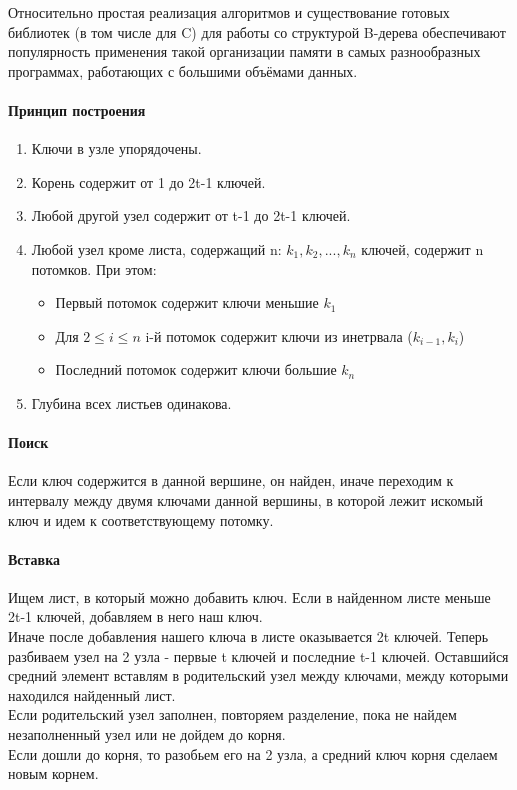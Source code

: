 \documentclass[a4paper,10pt]{article}
\begin{document}
Относительно простая реализация алгоритмов и существование готовых библиотек (в том числе для C) для работы со структурой B-дерева обеспечивают популярность применения такой организации памяти в самых разнообразных программах, работающих с большими объёмами данных.\\
\paragraph{Принцип построения}
\begin{enumerate}
	\item Ключи в узле упорядочены.
	\item Корень содержит от 1 до 2t-1 ключей.
	\item Любой другой узел содержит от t-1 до 2t-1 ключей.
	\item Любой узел кроме листа, содержащий n: $k_1, k_2, ..., k_n$ ключей, содержит n потомков. При этом:
\begin{itemize}
	\item Первый потомок содержит ключи меньшие $k_1$
	\item Для $2 \leq i \leq n$ i-й потомок содержит ключи из инетрвала ($k_{i-1}, k_i$)
	\item Последний потомок содержит ключи большие $k_n$
\end{itemize}
	\item Глубина всех листьев одинакова.
\end{enumerate}
\paragraph{Поиск} Если ключ содержится в данной вершине, он найден, иначе переходим к интервалу между двумя ключами данной вершины, в которой лежит искомый ключ и идем к соответствующему потомку.
\paragraph{Вставка}
Ищем лист, в который можно добавить ключ. Если в найденном листе меньше 2t-1 ключей, добавляем в него наш ключ.\\
Иначе после добавления нашего ключа в листе оказывается 2t ключей. Теперь разбиваем узел на 2 узла - первые t ключей и последние t-1 ключей. Оставшийся средний элемент вставлям в родительский узел между ключами, между которыми находился найденный лист.\\
Если родительский узел заполнен, повторяем разделение, пока не найдем незаполненный узел или не дойдем до корня.\\
Если дошли до корня, то разобьем его на 2 узла, а средний ключ корня сделаем новым корнем.\\
\end{document}
